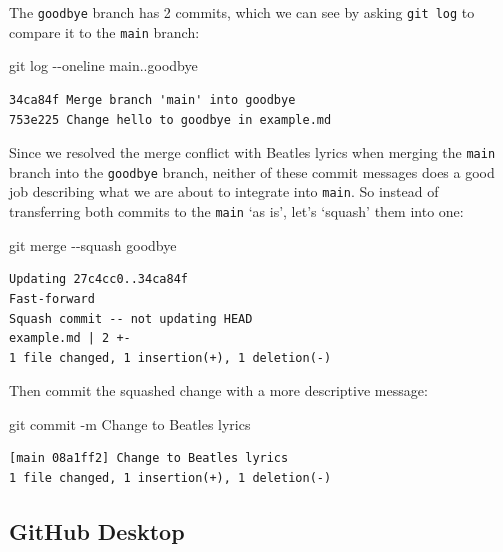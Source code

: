 \documentclass[
  letterpaper,
  DIV=11,
  numbers=noendperiod]{scrartcl}
\newenvironment{Shaded}{\begin{snugshade}}{\end{snugshade}}
\newcommand{\AttributeTok}[1]{\textcolor[rgb]{0.40,0.45,0.13}{#1}}
\newcommand{\FunctionTok}[1]{\textcolor[rgb]{0.28,0.35,0.67}{#1}}
\newcommand{\NormalTok}[1]{\textcolor[rgb]{0.00,0.23,0.31}{#1}}
\newcommand{\StringTok}[1]{\textcolor[rgb]{0.13,0.47,0.30}{#1}}
\begin{document}
The \texttt{goodbye} branch has 2 commits, which we can see by asking
\texttt{git\ log} to compare it to the \texttt{main} branch:

\begin{Shaded}
\begin{Highlighting}[]
\FunctionTok{git}\NormalTok{ log }\AttributeTok{{-}{-}oneline}\NormalTok{ main..goodbye}
\end{Highlighting}
\end{Shaded}

\begin{verbatim}
34ca84f Merge branch 'main' into goodbye
753e225 Change hello to goodbye in example.md
\end{verbatim}

Since we resolved the merge conflict with Beatles lyrics when merging
the \texttt{main} branch into the \texttt{goodbye} branch, neither of
these commit messages does a good job describing what we are about to
integrate into \texttt{main}. So instead of transferring both commits to
the \texttt{main} `as is', let's `squash' them into one:

\begin{Shaded}
\begin{Highlighting}[]
\FunctionTok{git}\NormalTok{ merge }\AttributeTok{{-}{-}squash}\NormalTok{ goodbye}
\end{Highlighting}
\end{Shaded}

\begin{verbatim}
Updating 27c4cc0..34ca84f
Fast-forward
Squash commit -- not updating HEAD
example.md | 2 +-
1 file changed, 1 insertion(+), 1 deletion(-)
\end{verbatim}

Then commit the squashed change with a more descriptive message:

\begin{Shaded}
\begin{Highlighting}[]
\FunctionTok{git}\NormalTok{ commit }\AttributeTok{{-}m} \StringTok{\textquotesingle{}Change to Beatles lyrics\textquotesingle{}}
\end{Highlighting}
\end{Shaded}

\begin{verbatim}
[main 08a1ff2] Change to Beatles lyrics
1 file changed, 1 insertion(+), 1 deletion(-)
\end{verbatim}

\subsection{GitHub Desktop}
\end{document}
